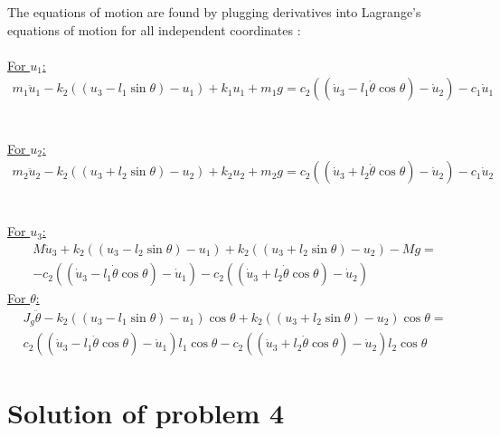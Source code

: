\documentclass[]{report}
\begin{document}
The equations of motion are found by plugging derivatives into Lagrange's equations of motion for all independent coordinates :\\
\\
\underline{For $u_1$:}
\begin{eqnarray*}
m_1 \ddot{u}_1-k_2\left(\left(u_3 -l_1 \sin{\theta}\right)-u_1\right)+k_1u_1+m_1 g=c_2 \left(\left(\dot{u}_3-l_1 \dot{\theta}\cos{\theta}\right)-\dot{u}_2\right)-c_1 \dot{u}_1
\end{eqnarray*}\\
\\
\underline{For $u_2$:}
\begin{eqnarray*}
m_2 \ddot{u}_2-k_2\left(\left(u_3+l_2 \sin{\theta}\right)-u_2\right)+k_2u_2+m_2 g=c_2 \left(\left(\dot{u}_3+l_2 \dot{\theta}\cos{\theta}\right)-\dot{u}_2\right)-c_1 \dot{u}_2
\end{eqnarray*}\\
\\
\underline{For $u_3$:}
\begin{eqnarray*}
M \ddot{u}_3+k_2\left(\left(u_3-l_2 \sin{\theta}\right)-u_1\right)+k_2\left(\left(u_3+l_2 \sin{\theta}\right)-u_2\right)- M g =\\ -c_2 \left(\left(\dot{u}_3-l_1 \dot{\theta}\cos{\theta}\right)-\dot{u}_1\right)-c_2 \left(\left(\dot{u}_3+l_2 \dot{\theta}\cos{\theta}\right)-\dot{u}_2\right)
\end{eqnarray*}
\underline{For $\theta$:}
\begin{eqnarray*}
J_g \ddot{\theta}-k_2\left(\left(u_3 -l_1 \sin{\theta}\right)-u_1\right) \cos{\theta}+k_2\left(\left(u_3 +l_2 \sin{\theta}\right)-u_2\right) \cos{\theta}=\\
c_2 \left(\left(\dot{u}_3-l_1 \dot{\theta}\cos{\theta}\right)-\dot{u}_1\right)l_1 \cos{\theta}-
c_2 \left(\left(\dot{u}_3+l_2 \dot{\theta}\cos{\theta}\right)-\dot{u}_2\right)l_2 \cos{\theta}
\end{eqnarray*}
\section*{Solution of problem 4}
\end{document}
